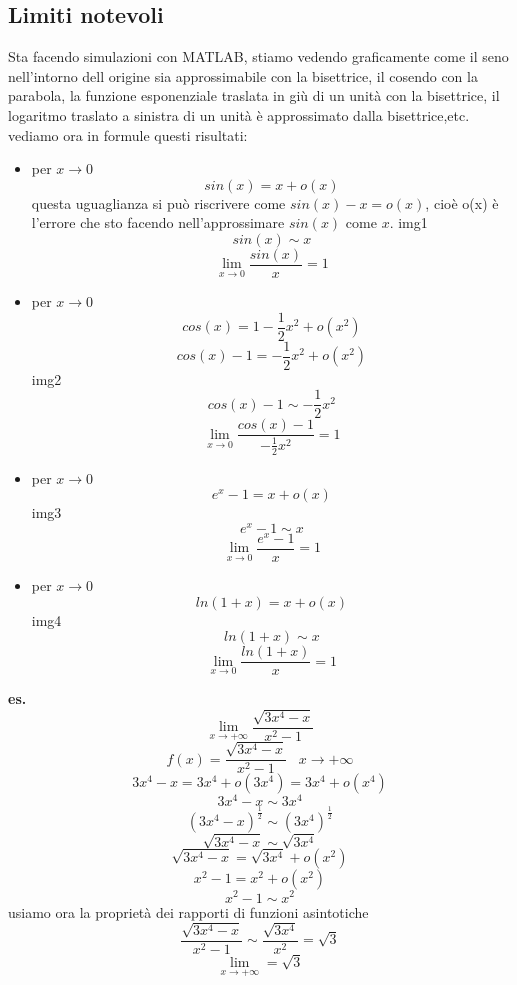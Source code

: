 \subsection*{Limiti notevoli}
Sta facendo simulazioni con MATLAB, stiamo vedendo graficamente come il seno nell'intorno dell origine sia approssimabile con la bisettrice, il cosendo con la parabola, la funzione esponenziale traslata in giù di un unità con la bisettrice, il logaritmo traslato a sinistra di un unità è approssimato dalla bisettrice,etc.
\newline
vediamo ora in formule questi risultati:
\begin{itemize}
    \item 
        per $x \rightarrow 0$
        \[
            sin (x) = x +o(x)
        \]
        questa uguaglianza si può riscrivere come $sin(x) - x = o(x)$, cioè o(x) è l'errore che sto facendo nell'approssimare $sin(x)$ come $x$.
        \newline
        img1
        \[
            sin(x) \sim x
        \]
        \[
            \lim_{x\rightarrow0} \frac{sin(x)}{x} = 1
        \]
    \item 
        per $x \rightarrow 0$
        \[
            cos (x) = 1- \frac{1}{2}x^2 +o(x^2)
        \]
        \[
            cos(x) -1 = -\frac{1}{2}x^2 + o(x^2)
        \]
        img2
        \[
            cos(x) -1 \sim -\frac{1}{2}x^2
        \]
        \[
            \lim_{x\rightarrow 0} \frac{cos(x) -1}{-\frac{1}{2}x^2} = 1
        \]
    \item 
        per $x \rightarrow 0$
        \[
            e^x -1 = x+o(x)
        \]
        img3
        \[
            e^x -1 \sim x
        \]
        \[
            \lim_{x\rightarrow 0} \frac{e^x-1}{x} = 1
        \]
    \item 
        per $x \rightarrow 0$
        \[
            ln(1+x) = x +o(x) 
        \]
        img4
        \[
            ln(1+x) \sim x 
        \]
        \[
            \lim_{x\rightarrow0}\frac{ln(1+x)}{x} = 1
        \]
\end{itemize}
\textbf{es.} 
\[
    \lim_{x\rightarrow + \infty} \frac{\sqrt{3x^4-x}}{x^2-1}
\]
\[
    f(x) = \frac{\sqrt{3x^4-x}}{x^2-1} \;\;\; x\rightarrow + \infty
\]
\[
    3x^4-x = 3x^4 + o(3x^4) = 3x^4 + o(x^4)
\]
\[
    3x^4-x  \sim  3 x^4
\]
\[
    (3x^4-x)^{\frac{1}{2}}  \sim  (3 x^4)^{\frac{1}{2}}
\]
\[
    \sqrt{3x^4-x} \sim  \sqrt{3 x^4}
\]
\[
    \sqrt{3x^4-x} = \sqrt{3x^4} + o(x^2)
\]
\[
    x^2-1 = x^2 +o(x^2)
\]
\[
    x^2 -1 \sim x^2
\]
usiamo ora la proprietà dei rapporti di funzioni asintotiche
\[
    \frac{\sqrt{3x^4-x}}{x^2-1} \sim \frac{\sqrt{3x^4}}{x^2} = \sqrt{3}
\]
\[
    \lim_{x\rightarrow+\infty} = \sqrt{3}
\]
